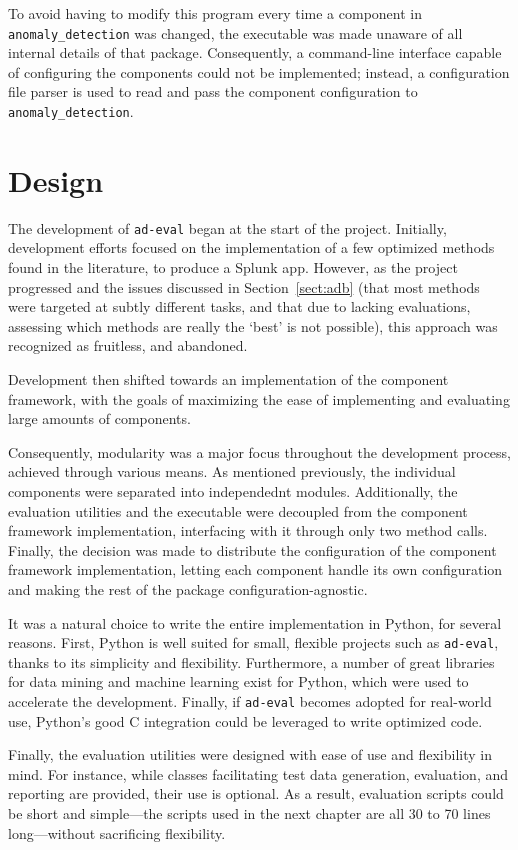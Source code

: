 To avoid having to modify this program every time a component in \texttt{anomaly\_detection} was changed, the executable was made unaware of all internal details of that package. Consequently, a command-line interface capable of configuring the components could not be implemented; instead, a configuration file parser is used to read and pass the component configuration to \texttt{anomaly\_detection}.

\section{Design}
\label{sect:design}

The development of \texttt{ad-eval} began at the start of the project. Initially, development efforts focused on the implementation of a few optimized methods found in the literature, to produce a Splunk app. However, as the project progressed and the issues discussed in Section~\ref{sect:adb} (that most methods were targeted at subtly different tasks, and that due to lacking evaluations, assessing which methods are really the `best' is not possible), this approach was recognized as fruitless, and abandoned.

Development then shifted towards an implementation of the component framework, with the goals of maximizing the ease of implementing and evaluating large amounts of components.

Consequently, modularity was a major focus throughout the development process, achieved through various means. As mentioned previously, the individual components were separated into independednt modules. Additionally, the evaluation utilities and the executable were decoupled from the component framework implementation, interfacing with it through only two method calls. Finally, the decision was made to distribute the configuration of the component framework implementation, letting each component handle its own configuration and making the rest of the package configuration-agnostic.

It was a natural choice to write the entire implementation in Python, for several reasons. First, Python is well suited for small, flexible projects such as \texttt{ad-eval}, thanks to its simplicity and flexibility. Furthermore, a number of great libraries for data mining and machine learning exist for Python, which were used to accelerate the development. Finally, if \texttt{ad-eval} becomes adopted for real-world use, Python's good C integration could be leveraged to write optimized code. 

Finally, the evaluation utilities were designed with ease of use and flexibility in mind. For instance, while classes facilitating test data generation, evaluation, and reporting are provided, their use is optional. As a result, evaluation scripts could be short and simple---the scripts used in the next chapter are all 30 to 70 lines long---without sacrificing flexibility.
